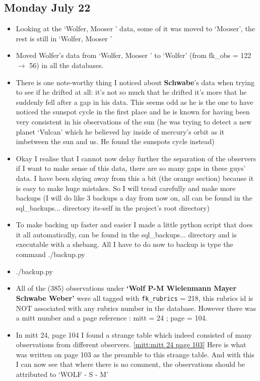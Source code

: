 \documentclass[12pt]{article}
\begin{document}
\subsection{Monday July 22}
\begin{itemize}
    \item Looking at the `Wolfer, Mooser ' data, some of it was moved to `Mooser', the rest is still in `Wolfer, Mooser '
    \item Moved Wolfer's data from `Wolfer, Mooser ' to `Wolfer' (from fk\_obs = 122 $\to$ 56) in all the databases.
    \item There is one note-worthy thing I noticed about \textbf{Schwabe}'s data when trying to see if he drifted at all: it's not so much that he drifted it's more that he suddenly fell after a gap in his data. This seems odd as he is the one to have noticed the sunspot cycle in the first place and he is known for having been very consistent in his observations of the sun (he was trying to detect a new planet `Vulcan' which he believed lay inside of mercury's orbit as it imbetween the sun and us. He found the sunspots cycle instead)
    \item Okay I realise that I cannot now delay further the separation of the observers if I want to make sense of this data, there are so many gaps in these guys' data. I have been shying away from this a bit (the orange section) because it is easy to make huge mistakes. So I will tread carefully and make more backups (I will do like 3 backups a day from now on, all can be found in the sql\_backups... directory its-self in the project's root directory)
    \item To make backing up faster and easier I made a little python script that does it all automatically, can be found in the sql\_backups... directory and is executable with a shebang. All I have to do now to backup is type the command ./backup.py
    \item ./backup.py
    \item All of the (385) observations under \textbf{`Wolf P-M Wielenmann Mayer Schwabe Weber'} were all tagged with \texttt{fk\_rubrics} = 218, this rubrics id is NOT associated with any rubrics number in the database. However there was a mitt number and a page reference : mitt = 24 ; page = 104. 
    \item In mitt 24, page 104 I found a strange table which indeed consisted of many observations from different observers. \ref{mitt:mitt 24 page 103} Here is what was written on page 103 as the preamble to this strange table. And with this I can now see that where there is no comment, the observations should be attributed to `WOLF - S - M'

\end{itemize}
\end{document}
